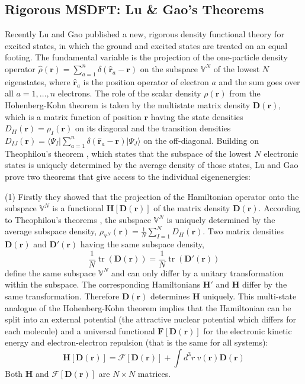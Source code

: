 \documentclass[journal=jpclcd,manuscript=letter]{achemso}
\DeclareMathOperator{\tr}{tr}
\newcommand\m[1]{\mathbf{#1}}
\renewcommand\vec[1]{\mathbf{#1}}
\begin{document}
\subsection{Rigorous MSDFT: Lu \& Gao's Theorems
\label{sec:lu_gao_theorems}
}
Recently Lu and Gao \cite{Lu2022JPCL} published a new, rigorous density functional theory for excited states, in which the ground
and excited states are treated on an equal footing. The fundamental variable is the projection
of the one-particle density operator $\hat{\rho}(\vec{r}) = \sum_{a=1}^{n} \delta(\hat{\vec{r}}_a - \vec{r})$ on the subspace
$\mathbb{V}^N$ of the lowest $N$ eigenstates, where $\hat{\vec{r}}_a$ is the position operator of electron $a$
and the sum goes over all $a=1,\ldots,n$ electrons.
The role of the scalar density $\rho(\vec{r})$
from the Hohenberg-Kohn theorem is taken by the multistate matrix density $\m{D}(\vec{r})$,
which is a matrix function of position $\vec{r}$
having the state densities $D_{II}(\vec{r}) = \rho_{I}(\vec{r})$ on its diagonal and the transition densities
$D_{IJ}(\vec{r}) = \langle \Psi_I \vert \sum_{a=1}^{n} \delta(\hat{\vec{r}}_a - \vec{r}) \vert \Psi_J \rangle$ on the off-diagonal.
Building on Theophilou's theorem \cite{Theophilou1979}, which states that the subspace of the lowest $N$ electronic states is uniquely
determined by the average density of those states, Lu and Gao prove two theorems that give access to the individual eigenenergies:

(1) Firstly they showed that the projection of the Hamiltonian operator onto the subspace $\mathbb{V}^N$ is a functional $\m{H}[\m{D}(\vec{r})]$ of the
matrix density $\m{D}(\vec{r})$. \cite[theorem 1]{Lu2022JPCL}
According to Theophilou's theorems \cite{Theophilou1979},
the subspace $\mathbb{V}^{N}$ is uniquely determined
by the average subspace density, $\rho_{\mathbb{V}^N}(\vec{r}) = \frac{1}{N} \sum_{I=1}^N D_{II}(\vec{r})$. Two matrix densities
$\m{D}(\vec{r})$ and $\m{D}'(\vec{r})$ having the same subspace density,
\begin{equation}
\frac{1}{N} \tr(\m{D}(\vec{r})) = \frac{1}{N} \tr(\m{D}'(\vec{r}))
\end{equation}
define the same subspace $\mathbb{V}^{N}$ and can only differ by a unitary transformation within the subspace. The
corresponding Hamiltonians $\m{H}'$ and $\m{H}$ differ by the same transformation. Therefore  $\m{D}(\vec{r})$
determines $\m{H}$ uniquely.
This multi-state analogue of the Hohenberg-Kohn theorem implies that the Hamiltonian can be split into an
external potential (the attractive nuclear potential which differs for each molecule) and a universal functional $\m{F}[\m{D}(\vec{r})]$ for the
electronic kinetic energy and electron-electron repulsion (that is the same for all systems):
\begin{equation}
 \m{H}[\m{D}(\vec{r})] = \m{\mathcal{F}}[\m{D}(\vec{r})] + \int d^3\!r ~ v(\vec{r}) \m{D}(\vec{r})
\end{equation}
Both $\m{H}$ and $\m{\mathcal{F}}[\m{D}(\vec{r})]$ are $N \times N$ matrices.
\end{document}
